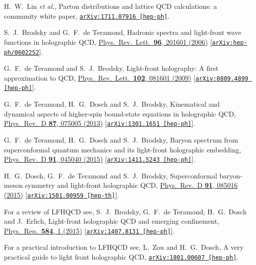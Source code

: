 \documentclass[aps,prl,reprint,groupedaddress, preprintnumbers]{revtex4-1}
\begin{document}
\begin{thebibliography}{50}
    
  H.~W.~Lin {\it et al.},
  Parton distributions and lattice QCD calculations: a community white paper,
  \href{https://arxiv.org/abs/1711.07916}{\tt arXiv:1711.07916 [hep-ph]}.
  
  
  S.~J.~Brodsky and G.~F.~de Teramond,
  Hadronic spectra and light-front wave functions in holographic QCD,
  \href{https://doi.org/10.1103/PhysRevLett.96.201601}{Phys.\ Rev.\ Lett.\  {\bf 96}, 201601 (2006)}
  [\href{http://arXiv.org/abs/hep-ph/0602252}{\tt arXiv:hep-ph/0602252}].


  G.~F.~de Teramond and S.~J.~Brodsky,
  Light-front holography: A first approximation to QCD,
  \href{https://doi.org/10.1103/PhysRevLett.102.081601}{Phys.\ Rev.\ Lett.\  {\bf 102}, 081601 (2009)}
 [\href{http://arXiv.org/abs/0809.4899}{\tt arXiv:0809.4899 [hep-ph]}].


 G.~F.~de Teramond, H.~G.~Dosch and S.~J.~Brodsky,
 Kinematical and dynamical aspects of higher-spin bound-state equations in holographic QCD,
 \href{https://doi.org/10.1103/PhysRevD.87.075005}{Phys.\ Rev.\ D {\bf 87}, 075005 (2013)}
 [\href{http://arxiv.org/abs/arXiv:1301.1651}{\tt arXiv:1301.1651 [hep-ph]}].


 G.~F.~de Teramond, H.~G.~Dosch and S.~J.~Brodsky,
 Baryon spectrum from superconformal quantum mechanics and its light-front holographic embedding,
 \href{https://doi.org/10.1103/PhysRevD.91.045040}{Phys.\
 Rev.\ D {\bf 91}, 045040 (2015)}
 [\href{http://arxiv.org/abs/arXiv:1411.5243}{\tt arXiv:1411.5243 [hep-ph]}].


 H.~G.~Dosch, G.~F.~de Teramond and S.~J.~Brodsky,
 Superconformal baryon-meson symmetry and light-front holographic QCD,
 \href{https://doi.org/10.1103/PhysRevD.91.085016}{Phys.\ Rev.\ D {\bf 91}, 085016 (2015)}
 [\href{http://arxiv.org/abs/1501.00959}{\tt arXiv:1501.00959 [hep-th]}].


 For a review of LFHQCD see, 
 S.~J.~Brodsky, G.~F.~de Teramond, H.~G.~Dosch and J.~Erlich,
 Light-front holographic QCD and emerging confinement,
 \href{https://doi.org/10.1016/j.physrep.2015.05.001}{Phys.\ Rep.\  {\bf 584}, 1 (2015)}
 [\href{http://arxiv.org/abs/1407.8131}{\tt arXiv:1407.8131 [hep-ph]}].
 
 
  For a practical introduction to LFHQCD see,
  L.~Zou and H.~G.~Dosch,
  A very practical guide to light front holographic QCD,
  \href{https://arxiv.org/abs/1801.00607}{\tt arXiv:1801.00607 [hep-ph]}. 


\end{thebibliography}
\end{document}
